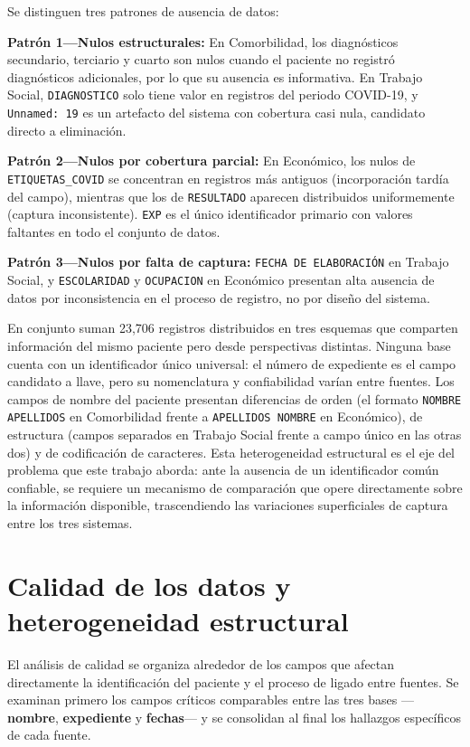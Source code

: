 Se distinguen tres patrones de ausencia de datos:

\textbf{Patrón 1---Nulos estructurales:} En Comorbilidad, los diagnósticos secundario, terciario y cuarto son nulos cuando el paciente no registró diagnósticos adicionales, por lo que su ausencia es informativa. En Trabajo Social, \texttt{DIAGNOSTICO} solo tiene valor en registros del periodo COVID-19, y \texttt{Unnamed: 19} es un artefacto del sistema con cobertura casi nula, candidato directo a eliminación.

\textbf{Patrón 2---Nulos por cobertura parcial:} En Económico, los nulos de \texttt{ETIQUETAS\_COVID} se concentran en registros más antiguos (incorporación tardía del campo), mientras que los de \texttt{RESULTADO} aparecen distribuidos uniformemente (captura inconsistente). \texttt{EXP} es el único identificador primario con valores faltantes en todo el conjunto de datos.

\textbf{Patrón 3---Nulos por falta de captura:} \texttt{FECHA DE ELABORACIÓN} en Trabajo Social, y \texttt{ESCOLARIDAD} y \texttt{OCUPACION} en Económico presentan alta ausencia de datos por inconsistencia en el proceso de registro, no por diseño del sistema.


En conjunto suman 23,706 registros distribuidos en tres esquemas que comparten información del mismo paciente pero desde perspectivas distintas. Ninguna base cuenta con un identificador único universal: el número de expediente es el campo candidato a llave, pero su nomenclatura y confiabilidad varían entre fuentes. Los campos de nombre del paciente presentan diferencias de orden (el formato \texttt{NOMBRE APELLIDOS} en Comorbilidad frente a \texttt{APELLIDOS NOMBRE} en Económico), de estructura (campos separados en Trabajo Social frente a campo único en las otras dos) y de codificación de caracteres. Esta heterogeneidad estructural es el eje del problema que este trabajo aborda: ante la ausencia de un identificador común confiable, se requiere un mecanismo de comparación que opere directamente sobre la información disponible, trascendiendo las variaciones superficiales de captura entre los tres sistemas.

\section{Calidad de los datos y heterogeneidad estructural}

El análisis de calidad se organiza alrededor de los campos que afectan directamente la identificación del paciente y el proceso de ligado entre fuentes. Se examinan primero los campos críticos comparables entre las tres bases ---\textbf{nombre}, \textbf{expediente} y \textbf{fechas}--- y se consolidan al final los hallazgos específicos de cada fuente.

